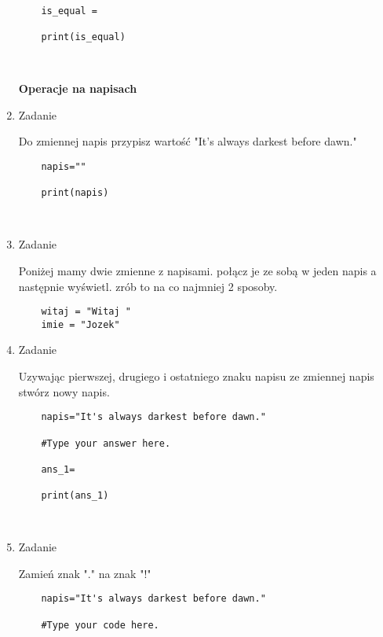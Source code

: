 \documentclass[11pt]{article}
\begin{document}
\begin{enumerate}
\begin{lstlisting}
	is_equal = 
	
	print(is_equal)
	
	
\end{lstlisting}

\medskip
\begin{Large}
	\textbf{Operacje na napisach}
\end{Large}

	\item 
\begin{Large}
	Zadanie
\end{Large}
\par
Do zmiennej napis przypisz wartość "It's always darkest before dawn."
\begin{lstlisting}
	napis=""
	
	print(napis)
	
	
\end{lstlisting}

\item 
\begin{Large}
	Zadanie
\end{Large}
\par
Poniżej mamy dwie zmienne z napisami. połącz je ze sobą w jeden napis a następnie wyświetl. zrób to na co najmniej 2 sposoby.
\begin{lstlisting}
	witaj = "Witaj "
	imie = "Jozek"
\end{lstlisting}

	\item 
\begin{Large}
	Zadanie
\end{Large}
\par
Uzywając pierwszej, drugiego i ostatniego znaku napisu ze zmiennej napis stwórz nowy napis.
\begin{lstlisting}
	napis="It's always darkest before dawn."
	
	#Type your answer here.
	
	ans_1=
	
	print(ans_1)
	
	
\end{lstlisting}

	\item 
\begin{Large}
	Zadanie
\end{Large}
\par
Zamień znak "." na znak "!"
\begin{lstlisting}
	napis="It's always darkest before dawn."
	
	#Type your code here.
	

\end{lstlisting}
\end{enumerate}
\end{document}
